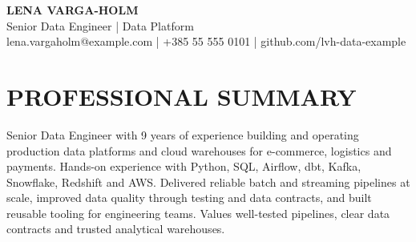 \documentclass[11pt,a4paper]{article}
\begin{document}
\begin{center}
{\LARGE\bfseries\color{primarycolor} LENA VARGA-HOLM}\\[0.25em]
{\large Senior Data Engineer | Data Platform}\\[0.25em]
{\small lena.vargaholm@example.com | +385 55 555 0101 | github.com/lvh-data-example}
\end{center}
\vspace{-0.5em}

\section*{PROFESSIONAL SUMMARY}
Senior Data Engineer with 9 years of experience building and operating production data platforms and cloud warehouses for e-commerce, logistics and payments. Hands-on experience with Python, SQL, Airflow, dbt, Kafka, Snowflake, Redshift and AWS. Delivered reliable batch and streaming pipelines at scale, improved data quality through testing and data contracts, and built reusable tooling for engineering teams. Values well-tested pipelines, clear data contracts and trusted analytical warehouses.
\end{document}

